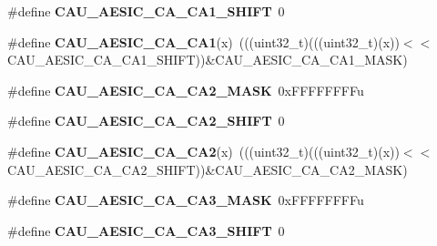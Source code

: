 \begin{DoxyCompactItemize}
\item 
\#define {\bfseries C\+A\+U\+\_\+\+A\+E\+S\+I\+C\+\_\+\+C\+A\+\_\+\+C\+A1\+\_\+\+S\+H\+I\+FT}~0\hypertarget{group__CAU__Register__Masks_gaf213071e5350ac7fb8d15b65685e8fa8}{}\label{group__CAU__Register__Masks_gaf213071e5350ac7fb8d15b65685e8fa8}

\item 
\#define {\bfseries C\+A\+U\+\_\+\+A\+E\+S\+I\+C\+\_\+\+C\+A\+\_\+\+C\+A1}(x)~(((uint32\+\_\+t)(((uint32\+\_\+t)(x))$<$$<$C\+A\+U\+\_\+\+A\+E\+S\+I\+C\+\_\+\+C\+A\+\_\+\+C\+A1\+\_\+\+S\+H\+I\+FT))\&C\+A\+U\+\_\+\+A\+E\+S\+I\+C\+\_\+\+C\+A\+\_\+\+C\+A1\+\_\+\+M\+A\+SK)\hypertarget{group__CAU__Register__Masks_ga7c110676eacf3149cb4a6912d40377e9}{}\label{group__CAU__Register__Masks_ga7c110676eacf3149cb4a6912d40377e9}

\item 
\#define {\bfseries C\+A\+U\+\_\+\+A\+E\+S\+I\+C\+\_\+\+C\+A\+\_\+\+C\+A2\+\_\+\+M\+A\+SK}~0x\+F\+F\+F\+F\+F\+F\+F\+Fu\hypertarget{group__CAU__Register__Masks_gaacb6f7c612e15617ec7318cff9480c0f}{}\label{group__CAU__Register__Masks_gaacb6f7c612e15617ec7318cff9480c0f}

\item 
\#define {\bfseries C\+A\+U\+\_\+\+A\+E\+S\+I\+C\+\_\+\+C\+A\+\_\+\+C\+A2\+\_\+\+S\+H\+I\+FT}~0\hypertarget{group__CAU__Register__Masks_ga24294c0df349c7b5264631d50b683247}{}\label{group__CAU__Register__Masks_ga24294c0df349c7b5264631d50b683247}

\item 
\#define {\bfseries C\+A\+U\+\_\+\+A\+E\+S\+I\+C\+\_\+\+C\+A\+\_\+\+C\+A2}(x)~(((uint32\+\_\+t)(((uint32\+\_\+t)(x))$<$$<$C\+A\+U\+\_\+\+A\+E\+S\+I\+C\+\_\+\+C\+A\+\_\+\+C\+A2\+\_\+\+S\+H\+I\+FT))\&C\+A\+U\+\_\+\+A\+E\+S\+I\+C\+\_\+\+C\+A\+\_\+\+C\+A2\+\_\+\+M\+A\+SK)\hypertarget{group__CAU__Register__Masks_ga5442af2bec924cd321147bd405a1a191}{}\label{group__CAU__Register__Masks_ga5442af2bec924cd321147bd405a1a191}

\item 
\#define {\bfseries C\+A\+U\+\_\+\+A\+E\+S\+I\+C\+\_\+\+C\+A\+\_\+\+C\+A3\+\_\+\+M\+A\+SK}~0x\+F\+F\+F\+F\+F\+F\+F\+Fu\hypertarget{group__CAU__Register__Masks_ga889b99e5fda65da20c1e40cdf1633bdc}{}\label{group__CAU__Register__Masks_ga889b99e5fda65da20c1e40cdf1633bdc}

\item 
\#define {\bfseries C\+A\+U\+\_\+\+A\+E\+S\+I\+C\+\_\+\+C\+A\+\_\+\+C\+A3\+\_\+\+S\+H\+I\+FT}~0\hypertarget{group__CAU__Register__Masks_gaa4221586809a5c86c3209735723f6427}{}\label{group__CAU__Register__Masks_gaa4221586809a5c86c3209735723f6427}


\end{DoxyCompactItemize}
